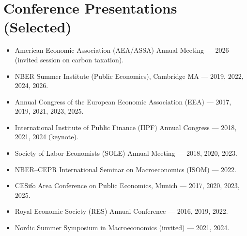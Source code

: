 \documentclass[11pt]{article}
\newcommand{\NEW}[1]{\textcolor{newgreen}{#1}}%
\newcommand{\NEW}[1]{#1}%
\begin{document}
\section{Conference Presentations (Selected)}
\begin{itemize}
\item \NEW{American Economic Association (AEA/ASSA) Annual Meeting --- 2026 (invited session on carbon taxation).}
\item NBER Summer Institute (Public Economics), Cambridge MA --- 2019, 2022, 2024, 2026.
\item Annual Congress of the European Economic Association (EEA) --- 2017, 2019, 2021, 2023, 2025.
\item International Institute of Public Finance (IIPF) Annual Congress --- 2018, 2021, 2024 (keynote).
\item Society of Labor Economists (SOLE) Annual Meeting --- 2018, 2020, 2023.
\item NBER--CEPR International Seminar on Macroeconomics (ISOM) --- 2022.
\item CESifo Area Conference on Public Economics, Munich --- 2017, 2020, 2023, 2025.
\item Royal Economic Society (RES) Annual Conference --- 2016, 2019, 2022.
\item Nordic Summer Symposium in Macroeconomics (invited) --- 2021, 2024.
\end{itemize}

\end{document}
